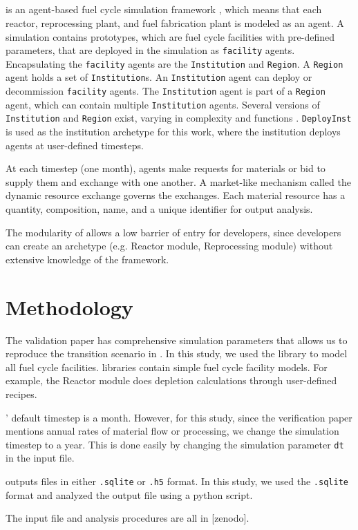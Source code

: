 \subsection{\Cyclus}

\Cyclus is an agent-based fuel cycle simulation framework 
\cite{huff_fundamental_2016}, which means 
that each reactor, reprocessing plant, and fuel fabrication plant is modeled as an agent.
A \Cyclus simulation contains prototypes, which are fuel cycle facilities with
pre-defined parameters, that are deployed in the simulation as \texttt{facility} agents.
Encapsulating the \texttt{facility} agents are the \texttt{Institution} and \texttt{Region}.
A \texttt{Region} agent holds a set of \texttt{Institution}s.
An \texttt{Institution} agent can deploy or decommission \texttt{facility} agents.
The \texttt{Institution} agent is part of a \texttt{Region} agent,
which can contain multiple \texttt{Institution} agents. Several versions of \texttt{Institution}
and \texttt{Region} exist, varying in complexity and functions \cite{huff_extensions_2014}.
 \texttt{DeployInst} is used as the institution archetype for this work, where the institution
deploys agents at user-defined timesteps.

At each timestep (one month),
agents make requests for materials or bid to supply them and exchange
with one another. A market-like mechanism called the dynamic resource exchange
\cite{gidden_agent-based_2015} governs the exchanges.
Each material resource has a quantity, composition, name, and a unique identifier
for output analysis.

The modularity of \Cyclus allows a low barrier of
entry for developers, since developers can create an
archetype (e.g. Reactor module, Reprocessing module)
without extensive knowledge of the \Cyclus framework.


\section{Methodology}

The validation paper \cite{feng_standardized_2016}
has comprehensive simulation parameters that allows
us to reproduce the transition scenario in \Cyclus.
In this
study, we used the \Cycamore library to model
all fuel cycle facilities. \Cycamore libraries contain
simple fuel cycle facility models. For example,
the Reactor module does depletion calculations through
user-defined recipes.

\Cyclus' default timestep is a month. However, for this
study, since the verification paper mentions annual
rates of material flow or processing, we change the \Cyclus
simulation timestep to a year. This is done easily
by changing the simulation parameter \texttt{dt} in the input file.

\Cyclus outputs files in either \texttt{.sqlite} or
\texttt{.h5} format. In this study, we used the 
\texttt{.sqlite} format and analyzed the output file
using a python script.

The input file and analysis procedures are all in
[zenodo].


